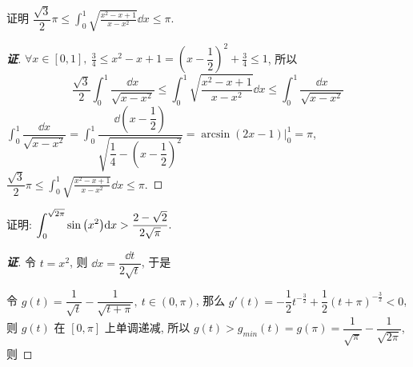 \begin{example}
    证明 $\displaystyle\dfrac{\sqrt{3}}{2}\pi\leqslant \int_{0}^{1}\sqrt{\frac{x^2-x+1}{x-x^2}}\dd x\leqslant \pi.$
\end{example}
\begin{proof}[{\songti \textbf{证}}]
    $\displaystyle\forall x\in[0,1],~\frac{3}{4}\leqslant x^2-x+1=\left(x-\dfrac{1}{2}\right)^2+\frac{3}{4}\leqslant 1$, 所以
    $$\dfrac{\sqrt{3}}{2}\int _{0}^{1}\dfrac{\dd x}{\sqrt{x-x^{2}}}\leqslant \int _{0}^{1}\sqrt{\dfrac{x^{2}-x+1}{x-x^{2}}}\dd x\leqslant \int _{0}^{1}\dfrac{\dd x}{\sqrt{x-x^{2}}}$$
    $\displaystyle \int _{0}^{1}\dfrac{\dd x}{\sqrt{x-x^{2}}}=\int _{0}^{1}\dfrac{\dd \left( x-\dfrac{1}{2}\right) }{\sqrt{\dfrac{1}{4}-\left( x-\dfrac{1}{2}\right)^2}}=\arcsin \left( 2x-1\right)\bigg |_0^1=\pi $,
    $\displaystyle \dfrac{\sqrt{3}}{2}\pi\leqslant \int_{0}^{1}\sqrt{\frac{x^2-x+1}{x-x^2}}\dd x\leqslant \pi.$
\end{proof}

\begin{example}
    证明: $\displaystyle \int_{0}^{\sqrt{2\pi}}\sin\qty(x^2)\dd x>\dfrac{2-\sqrt{2}}{2\sqrt{\pi}}.$
\end{example}
\begin{proof}[{\songti \textbf{证}}]
    令 $t=x^2$, 则 $\dd x=\dfrac{\dd t}{2\sqrt{t}}$, 于是
    令 $g(t)=\dfrac{1}{\sqrt{t}}-\dfrac{1}{\sqrt{t+\pi}},~t\in(0,\pi)$, 那么 $g'(t)=-\dfrac{1}{2}t^{-\frac{3}{2}}+\dfrac{1}{2}(t+\pi)^{-\frac{3}{2}}<0$, 则 $g(t)$ 在 $[0,\pi]$ 上单调递减,
    所以 $g(t)>g_{min}(t)=g(\pi)=\dfrac{1}{\sqrt{\pi}}-\dfrac{1}{\sqrt{2\pi}}$, 则
\end{proof}

